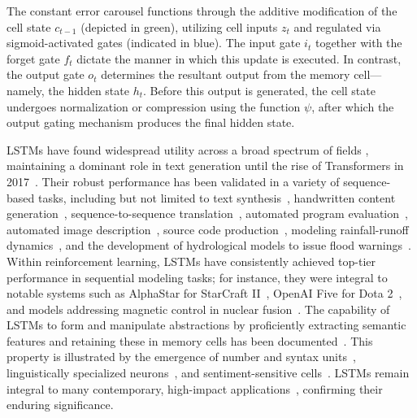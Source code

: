 The constant error carousel functions through the additive modification of the cell state $c_{t-1}$ (depicted in green), utilizing cell inputs $z_t$ and regulated via sigmoid-activated gates (indicated in blue). The input gate $i_t$ together with the forget gate $f_t$ dictate the manner in which this update is executed. In contrast, the output gate $o_t$ determines the resultant output from the memory cell—namely, the hidden state $h_t$. Before this output is generated, the cell state undergoes normalization or compression using the function $\psi$, after which the output gating mechanism produces the final hidden state.

LSTMs have found widespread utility across a broad spectrum of fields \citep{Hochreiter:01,Hochreiter:07,Schmidhuber:15}, maintaining a dominant role in text generation until the rise of Transformers in 2017~\citep{Vaswani:17}. Their robust performance has been validated in a variety of sequence-based tasks, including but not limited to text synthesis~\citep{Graves:13,Karpathy:15blog}, handwritten content generation~\citep{Graves:13}, sequence-to-sequence translation~\citep{Sutskever:14nips}, automated program evaluation~\citep{Zaremba:14arxiv}, automated image description~\citep{Karpathy:15,Hossain:19}, source code production~\citep{Karpathy:15blog}, modeling rainfall-runoff dynamics~\citep{Kratzert:18,Kratzert:19}, and the development of hydrological models to issue flood warnings~\citep{Nearing:24}. Within reinforcement learning, LSTMs have consistently achieved top-tier performance in sequential modeling tasks; for instance, they were integral to notable systems such as AlphaStar for StarCraft II~\citep{Vinyals:17short}, OpenAI Five for Dota 2~\citep{OpenAI:19}, and models addressing magnetic control in nuclear fusion~\citep{Degrave:22short}. The capability of LSTMs to form and manipulate abstractions by proficiently extracting semantic features and retaining these in memory cells has been documented~\citep{Karpathy:15blog}. This property is illustrated by the emergence of number and syntax units~\citep{Lakretz:19}, linguistically specialized neurons~\citep{Bau:19}, and sentiment-sensitive cells~\citep{Radford:17arxiv}. LSTMs remain integral to many contemporary, high-impact applications~\citep{Degrave:22short,Nearing:24}, confirming their enduring significance.


